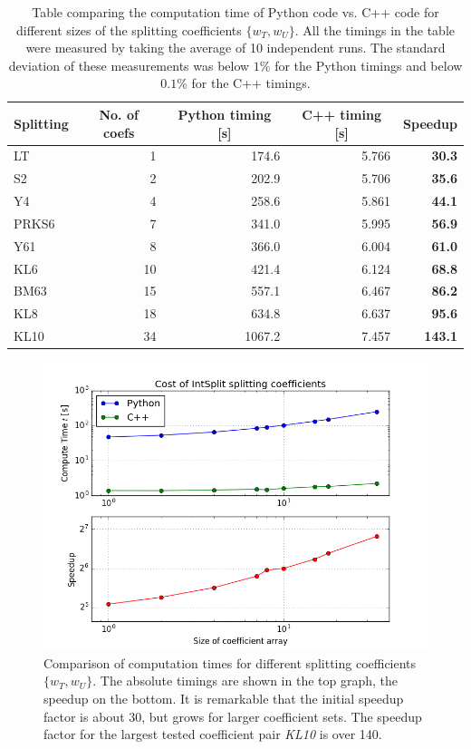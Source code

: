 \par\medskip
%
\begin{table}[ht]
	\centering
	\begin{tabular}{|l | r | r | r | r |} 
		\hline
		\multicolumn{1}{|c}{\textbf{Splitting}} &
		\multicolumn{1}{|c}{\textbf{No. of coefs}} &
		\multicolumn{1}{|c}{\textbf{Python timing [s]}} &
		\multicolumn{1}{|c}{\textbf{C++ timing [s]}} &
		\multicolumn{1}{|c|}{\textbf{Speedup}} \\
		\hline
		LT & 1 & 174.6 & 5.766 &\textbf{30.3} \\ 
		S2 & 2 & 202.9 & 5.706 &\textbf{35.6} \\
		Y4 & 4 & 258.6 & 5.861 &\textbf{44.1} \\
		PRKS6 & 7 & 341.0 & 5.995 &\textbf{56.9} \\ 
		Y61 & 8 & 366.0 & 6.004 &\textbf{61.0} \\
		KL6 & 10 & 421.4 & 6.124 &\textbf{68.8} \\
		BM63 & 15 & 557.1 & 6.467 &\textbf{86.2} \\ 
		KL8 & 18 & 634.8 & 6.637 &\textbf{95.6} \\
		KL10 & 34 & 1067.2 & 7.457 &\textbf{143.1} \\
		\hline
	\end{tabular}
	\caption{Table comparing the computation time of Python code vs. C++ code for different sizes of the splitting coefficients $\{ w_T, w_U \}$. All the timings in the table were measured by taking the average of 10 independent runs. The standard deviation of these measurements was below $1\%$ for the Python timings and below $0.1\%$ for the C++ timings.}
	\label{tab:benchmarksplit_t}
\end{table}
%
\begin{figure}[ht]
	\centering
	\begin{center}
	\includegraphics[width=.8\textwidth]{figures/coefficient_analysis.png}
	\end{center}
	\caption{Comparison of computation times for different splitting coefficients $\{ w_T, w_U \}$. The absolute timings are shown in the top graph, the speedup on the bottom. It is remarkable that the initial speedup factor is about 30, but grows for larger coefficient sets. The speedup factor for the largest tested coefficient pair \emph{KL10} is over 140.}
	\label{fig:benchmarksplit_f}
\end{figure}



